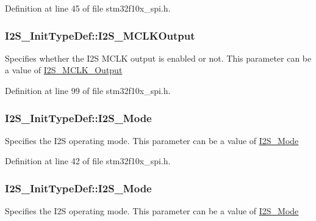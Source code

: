 Definition at line 45 of file stm32f10x\+\_\+spi.\+h.

\subsubsection[{\texorpdfstring{I2\+S\+\_\+\+M\+C\+L\+K\+Output}{I2S_MCLKOutput}}]{ I2\+S\+\_\+\+Init\+Type\+Def\+::\+I2\+S\+\_\+\+M\+C\+L\+K\+Output}\hypertarget{struct_i2_s___init_type_def_ae7aaf79b7f392d79ac2f7b35a24e5d1a}{}\label{struct_i2_s___init_type_def_ae7aaf79b7f392d79ac2f7b35a24e5d1a}
Specifies whether the I2S M\+C\+LK output is enabled or not. This parameter can be a value of \hyperlink{group___i2_s___m_c_l_k___output}{I2\+S\+\_\+\+M\+C\+L\+K\+\_\+\+Output} 

Definition at line 99 of file stm32f10x\+\_\+spi.\+h.

\subsubsection[{\texorpdfstring{I2\+S\+\_\+\+Mode}{I2S_Mode}}]{ I2\+S\+\_\+\+Init\+Type\+Def\+::\+I2\+S\+\_\+\+Mode}\hypertarget{struct_i2_s___init_type_def_affa4174dccf057c2ff09fa0d3a39f0ef}{}\label{struct_i2_s___init_type_def_affa4174dccf057c2ff09fa0d3a39f0ef}
Specifies the I2S operating mode. This parameter can be a value of \hyperlink{group___i2_s___mode}{I2\+S\+\_\+\+Mode} 

Definition at line 42 of file stm32f10x\+\_\+spi.\+h.

\subsubsection[{\texorpdfstring{I2\+S\+\_\+\+Mode}{I2S_Mode}}]{ I2\+S\+\_\+\+Init\+Type\+Def\+::\+I2\+S\+\_\+\+Mode}\hypertarget{struct_i2_s___init_type_def_aa57e5190eac245c0873a00849b1bd239}{}\label{struct_i2_s___init_type_def_aa57e5190eac245c0873a00849b1bd239}
Specifies the I2S operating mode. This parameter can be a value of \hyperlink{group___i2_s___mode}{I2\+S\+\_\+\+Mode} 


